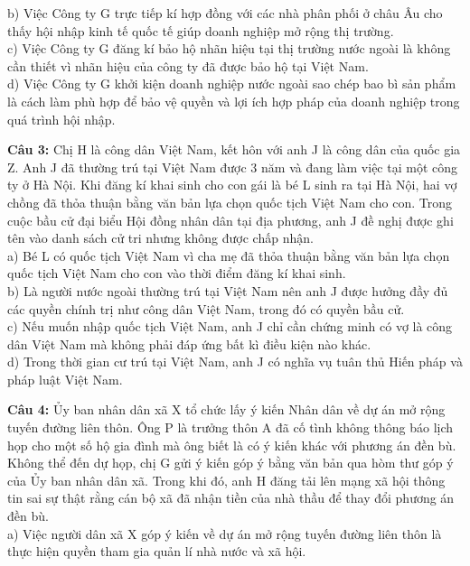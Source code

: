 \documentclass[12pt,a4paper]{article}
\begin{document}
\noindent b) Việc Công ty G trực tiếp kí hợp đồng với các nhà phân phối ở châu Âu cho thấy hội nhập kinh tế quốc tế giúp doanh nghiệp mở rộng thị trường.\\


\noindent c) Việc Công ty G đăng kí bảo hộ nhãn hiệu tại thị trường nước ngoài là không cần thiết vì nhãn hiệu của công ty đã được bảo hộ tại Việt Nam.\\


\noindent d) Việc Công ty G khởi kiện doanh nghiệp nước ngoài sao chép bao bì sản phẩm là cách làm phù hợp để bảo vệ quyền và lợi ích hợp pháp của doanh nghiệp trong quá trình hội nhập.

\noindent \textbf{Câu 3:} Chị H là công dân Việt Nam, kết hôn với anh J là công dân của quốc gia Z. Anh J đã thường trú tại Việt Nam được 3 năm và đang làm việc tại một công ty ở Hà Nội. Khi đăng kí khai sinh cho con gái là bé L sinh ra tại Hà Nội, hai vợ chồng đã thỏa thuận bằng văn bản lựa chọn quốc tịch Việt Nam cho con. Trong cuộc bầu cử đại biểu Hội đồng nhân dân tại địa phương, anh J đề nghị được ghi tên vào danh sách cử tri nhưng không được chấp nhận.\\
\noindent a) Bé L có quốc tịch Việt Nam vì cha mẹ đã thỏa thuận bằng văn bản lựa chọn quốc tịch Việt Nam cho con vào thời điểm đăng kí khai sinh.\\


\noindent b) Là người nước ngoài thường trú tại Việt Nam nên anh J được hưởng đầy đủ các quyền chính trị như công dân Việt Nam, trong đó có quyền bầu cử.\\


\noindent c) Nếu muốn nhập quốc tịch Việt Nam, anh J chỉ cần chứng minh có vợ là công dân Việt Nam mà không phải đáp ứng bất kì điều kiện nào khác.\\


\noindent d) Trong thời gian cư trú tại Việt Nam, anh J có nghĩa vụ tuân thủ Hiến pháp và pháp luật Việt Nam.

\noindent \textbf{Câu 4:} Ủy ban nhân dân xã X tổ chức lấy ý kiến Nhân dân về dự án mở rộng tuyến đường liên thôn. Ông P là trưởng thôn A đã cố tình không thông báo lịch họp cho một số hộ gia đình mà ông biết là có ý kiến khác với phương án đền bù. Không thể đến dự họp, chị G gửi ý kiến góp ý bằng văn bản qua hòm thư góp ý của Ủy ban nhân dân xã. Trong khi đó, anh H đăng tải lên mạng xã hội thông tin sai sự thật rằng cán bộ xã đã nhận tiền của nhà thầu để thay đổi phương án đền bù.\\
\noindent a) Việc người dân xã X góp ý kiến về dự án mở rộng tuyến đường liên thôn là thực hiện quyền tham gia quản lí nhà nước và xã hội.\\
\end{document}
